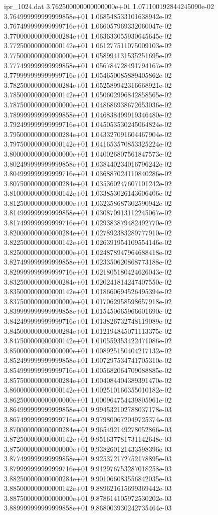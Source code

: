 \begin{filecontents}{ipr_1024.dat}
3.762500000000000000e+01 1.071100192844245090e-02
3.764999999999999858e+01 1.068548533101638942e-02
3.767499999999999716e+01 1.066057969332060047e-02
3.770000000000000284e+01 1.063633055930645645e-02
3.772500000000000142e+01 1.061277511075009103e-02
3.775000000000000000e+01 1.058994131535251695e-02
3.777499999999999858e+01 1.056784728491794167e-02
3.779999999999999716e+01 1.054650085889405862e-02
3.782500000000000284e+01 1.052589942316668921e-02
3.785000000000000142e+01 1.050602996842858565e-02
3.787500000000000000e+01 1.048686938672653036e-02
3.789999999999999858e+01 1.046838499919346480e-02
3.792499999999999716e+01 1.045053530245064824e-02
3.795000000000000284e+01 1.043327091604467904e-02
3.797500000000000142e+01 1.041653570853325224e-02
3.800000000000000000e+01 1.040026807561847573e-02
3.802499999999999858e+01 1.038440234016796242e-02
3.804999999999999716e+01 1.036887024110840286e-02
3.807500000000000284e+01 1.035360247607101242e-02
3.810000000000000142e+01 1.033853026143606406e-02
3.812500000000000000e+01 1.032358687302590942e-02
3.814999999999999858e+01 1.030870913112245067e-02
3.817499999999999716e+01 1.029383879482492770e-02
3.820000000000000284e+01 1.027892383289777910e-02
3.822500000000000142e+01 1.026391954109554146e-02
3.825000000000000000e+01 1.024878947964688418e-02
3.827499999999999858e+01 1.023350620868773188e-02
3.829999999999999716e+01 1.021805180424626043e-02
3.832500000000000284e+01 1.020241814247407550e-02
3.835000000000000142e+01 1.018660694526495394e-02
3.837500000000000000e+01 1.017062958598657918e-02
3.839999999999999858e+01 1.015450665966601690e-02
3.842499999999999716e+01 1.013826732748119089e-02
3.845000000000000284e+01 1.012194845071113375e-02
3.847500000000000142e+01 1.010559353422471086e-02
3.850000000000000000e+01 1.008925150404217132e-02
3.852499999999999858e+01 1.007297534741705310e-02
3.854999999999999716e+01 1.005682064709088885e-02
3.857500000000000284e+01 1.004084404389391470e-02
3.860000000000000142e+01 1.002510166355010182e-02
3.862500000000000000e+01 1.000964754439805961e-02
3.864999999999999858e+01 9.994532102788037178e-03
3.867499999999999716e+01 9.979800672049725374e-03
3.870000000000000284e+01 9.965492149278052866e-03
3.872500000000000142e+01 9.951637781731142648e-03
3.875000000000000000e+01 9.938260121433598396e-03
3.877499999999999858e+01 9.925372172752178895e-03
3.879999999999999716e+01 9.912976753287018258e-03
3.882500000000000284e+01 9.901066083556842035e-03
3.885000000000000142e+01 9.889621615699369442e-03
3.887500000000000000e+01 9.878614105972530202e-03
3.889999999999999858e+01 9.868003930242735464e-03

\end{filecontents}
